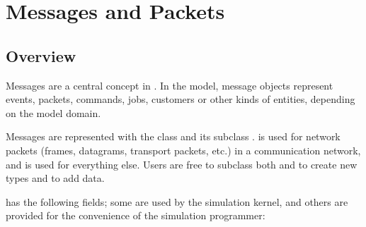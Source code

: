 \chapter{Messages and Packets}
\label{cha:messages}

\section{Overview}
\label{sec:ch-msgs:overview}

Messages are a central concept in {\opp}. In the model, message objects
represent events, packets, commands, jobs, customers or other kinds of
entities, depending on the model domain.

Messages are represented with the  class and its subclass
.  is used for network packets (frames,
datagrams, transport packets, etc.) in a communication network, and
 is used for everything else. Users are free to subclass
both  and  to create new types and to
add data.

 has the following fields; some are used by
the simulation kernel, and others are provided for the convenience
of the simulation programmer:

